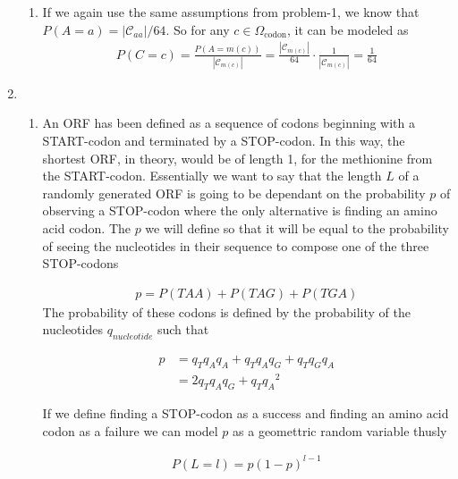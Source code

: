 \documentclass[12pt]{article}
\numberwithin{theorem}{subsection}
\theoremstyle{definition}
\numberwithin{definition}{subsection}
\numberwithin{corollary}{subsection}
\theoremstyle{remark}
\begin{document}
\begin{enumerate}[label=\textbf{\arabic*.}]
\begin{enumerate}[label = \textbf{\alph*.}]
            
            \item If we again use the same assumptions from problem-1, we know that $P(A = a) = |\mathcal{C}_{aa}| / 64$.  So for any $c \in \Omega_{\text{codon}}$, it can be modeled as
                \begin{align*}
                    P(C = c) = \frac{P(A =m(c))}{|\mathcal{C}_{m(c)}|} = \frac{|\mathcal{C}_{m(c)}|}{64}\cdot\frac{1}{|\mathcal{C}_{m(c)}|} = \frac{1}{64}
                \end{align*}

        \end{enumerate}
        
    \item 
        \begin{enumerate}[label = \textbf{\alph*.}]
            \item An ORF has been defined as a sequence of codons beginning with a START-codon and terminated by a STOP-codon. In this way, the shortest ORF, in theory, would be of length 1, for the methionine from the START-codon. Essentially we want to say that the length $L$ of a randomly generated ORF is going to be dependant on the probability $p$ of observing a STOP-codon where the only alternative is finding an amino acid codon. The $p$ we will define so that it will be equal to the probability of seeing the nucleotides in their sequence to compose one of the three STOP-codons

            	\begin{align*}
                    p = P(TAA) + P(TAG) + P(TGA)
                \end{align*}
            The probability of these codons is defined by the probability of the nucleotides $q_{nucleotide}$ such that

            	\begin{align*}
                    p 	&= q_{T}q_{A}q_{A} + q_{T}q_{A}q_{G} + q_{T}q_{G}q_{A} \\
                    	&= 2q_{T}q_{A}q_{G} + q_{T}{q_{A}}^2
                \end{align*}

            If we define finding a STOP-codon as a success and finding an amino acid codon as a failure we can model $p$ as a geomettric random variable thusly
       
                \begin{align*}
                    P(L = l) = p(1 - p)^{l - 1}
                \end{align*}


\end{enumerate}
\end{enumerate}
\end{document}
